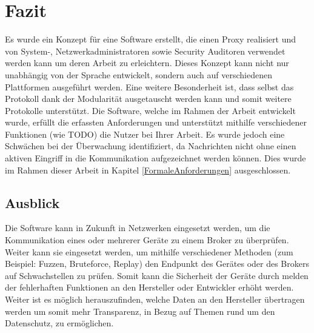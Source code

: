 \chapter{Fazit}
Es wurde ein Konzept für eine Software erstellt, die einen Proxy realisiert und von System-, Netzwerkadministratoren sowie Security Auditoren verwendet werden kann um deren Arbeit zu erleichtern. Dieses Konzept kann nicht nur unabhängig von der Sprache entwickelt, sondern auch auf verschiedenen Plattformen ausgeführt werden. Eine weitere Besonderheit ist, dass selbst das Protokoll dank der Modularität ausgetauscht werden kann und somit weitere Protokolle unterstützt.
Die Software, welche im Rahmen der Arbeit entwickelt wurde, erfüllt die erfassten Anforderungen und unterstützt mithilfe verschiedener Funktionen (wie TODO) die Nutzer bei Ihrer Arbeit. Es wurde jedoch eine Schwächen bei der Überwachung identifiziert, da Nachrichten nicht ohne einen aktiven Eingriff in die Kommunikation aufgezeichnet werden können. Dies wurde im Rahmen dieser Arbeit in Kapitel \ref{FormaleAnforderungen} ausgeschlossen.


\section{Ausblick}
Die Software kann in Zukunft in Netzwerken eingesetzt werden, um die Kommunikation eines oder mehrerer Geräte zu einem Broker zu überprüfen.
Weiter kann sie eingesetzt werden, um mithilfe verschiedener Methoden (zum Beispiel: Fuzzen, Bruteforce, Replay) den Endpunkt des Gerätes oder des Brokers auf Schwachstellen zu prüfen. Somit kann die Sicherheit der Geräte durch melden der fehlerhaften Funktionen an den Hersteller oder Entwickler erhöht werden. Weiter ist es möglich herauszufinden, welche Daten an den Hersteller übertragen werden um somit mehr Transparenz, in Bezug auf Themen rund um den Datenschutz, zu ermöglichen.

